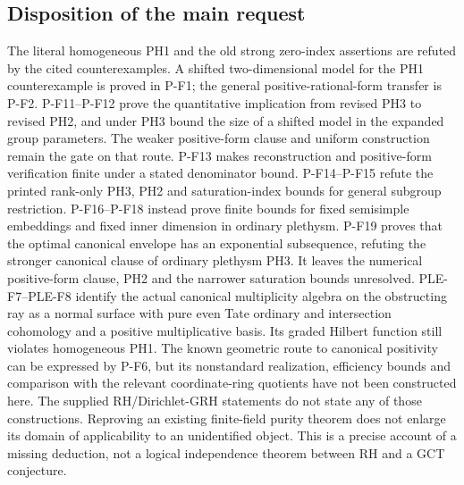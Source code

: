 \subsection{Disposition of the main request}
The literal homogeneous PH1 and the old strong zero-index assertions
are refuted by the cited counterexamples. A shifted two-dimensional
model for the PH1 counterexample is proved in P-F1; the general
positive-rational-form transfer is P-F2. P-F11--P-F12 prove the
quantitative implication from revised PH3 to revised PH2, and under
PH3 bound the size of a shifted model in the expanded group parameters.
The weaker positive-form clause and uniform construction remain the
gate on that route. P-F13 makes reconstruction and positive-form verification
finite under a stated denominator bound. P-F14--P-F15 refute the
printed rank-only PH3, PH2 and saturation-index bounds for general
subgroup restriction. P-F16--P-F18 instead prove finite bounds for
fixed semisimple embeddings and fixed inner dimension in ordinary
plethysm. P-F19 proves that the optimal canonical envelope has an
exponential subsequence, refuting the stronger canonical clause of
ordinary plethysm PH3. It leaves the numerical positive-form clause,
PH2 and the narrower saturation bounds unresolved.
PLE-F7--PLE-F8 identify the actual canonical multiplicity algebra on
the obstructing ray as a normal surface with pure even Tate ordinary
and intersection cohomology and a positive multiplicative basis.
Its graded Hilbert function still violates homogeneous PH1.
The known geometric route to
canonical positivity can be expressed by P-F6, but its nonstandard
realization, efficiency bounds and comparison with the relevant
coordinate-ring quotients have not been constructed here.
The supplied RH/Dirichlet-GRH statements do not state any of those
constructions. Reproving an existing finite-field purity theorem does
not enlarge its domain of applicability to an unidentified object.
This is a precise account of a missing deduction, not a logical
independence theorem between RH and a GCT conjecture.
